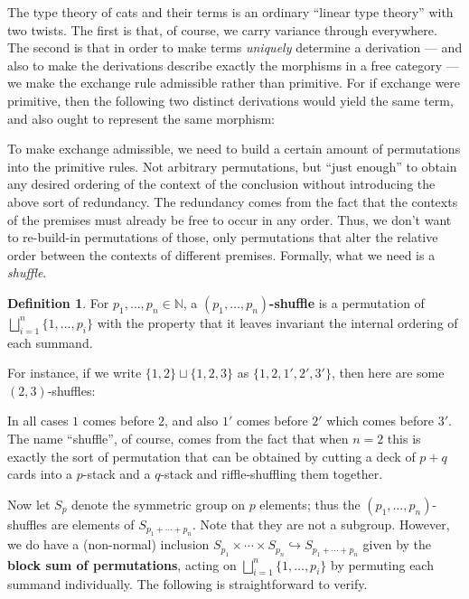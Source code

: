 \documentclass{amsart}
\let\types\vdash %
\theoremstyle{definition}
\newtheorem{defn}{Definition}
\begin{document}
The type theory of cats and their terms is an ordinary ``linear type theory'' with two twists.
The first is that, of course, we carry variance through everywhere.
The second is that in order to make terms \emph{uniquely} determine a derivation --- and also to make the derivations describe exactly the morphisms in a free category --- we make the exchange rule admissible rather than primitive.
For if exchange were primitive, then the following two distinct derivations would yield the same term, and also ought to represent the same morphism:

To make exchange admissible, we need to build a certain amount of permutations into the primitive rules.
Not arbitrary permutations, but ``just enough'' to obtain any desired ordering of the context of the conclusion without introducing the above sort of redundancy.
The redundancy comes from the fact that the contexts of the premises must already be free to occur in any order.
Thus, we don't want to re-build-in permutations of those, only permutations that alter the relative order between the contexts of different premises.
Formally, what we need is a \emph{shuffle}.

\begin{defn}
  For $p_1,\dots,p_n \in \mathbb{N}$, a \textbf{$(p_1,\dots,p_n)$-shuffle} is a permutation of $\bigsqcup_{i=1}^n\{1,\dots,p_i\}$ with the property that it leaves invariant the internal ordering of each summand.
\end{defn}

For instance, if we write $\{1,2\}\sqcup \{1,2,3\}$ as $\{1,2,1',2',3'\}$, then here are some $(2,3)$-shuffles:
In all cases $1$ comes before $2$, and also $1'$ comes before $2'$ which comes before $3'$.
The name ``shuffle'', of course, comes from the fact that when $n=2$ this is exactly the sort of permutation that can be obtained by cutting a deck of $p+q$ cards into a $p$-stack and a $q$-stack and riffle-shuffling them together.

Now let $S_p$ denote the symmetric group on $p$ elements; thus the $(p_1,\dots,p_n)$-shuffles are elements of $S_{p_1+\cdots+p_n}$.
Note that they are not a subgroup.
However, we do have a (non-normal) inclusion $S_{p_1}\times \cdots\times S_{p_n} \hookrightarrow S_{p_1+\cdots+p_n}$ given by the \textbf{block sum of permutations}, acting on $\bigsqcup_{i=1}^n\{1,\dots,p_i\}$ by permuting each summand individually.
The following is straightforward to verify.
\end{document}
